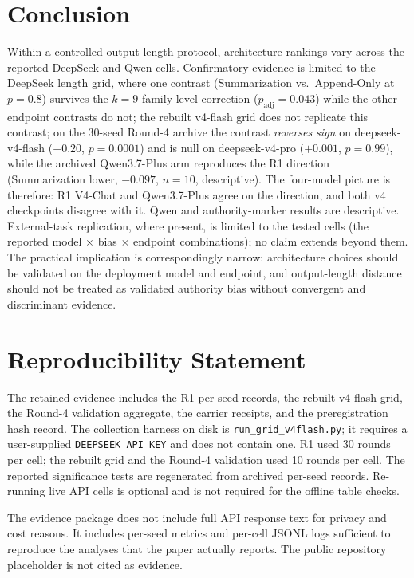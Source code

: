 \documentclass[11pt]{article}
\begin{document}
\section{Conclusion}

Within a controlled output-length protocol, architecture rankings vary across the reported DeepSeek and Qwen cells. Confirmatory evidence is limited to the DeepSeek length grid, where one contrast (Summarization vs.\ Append-Only at $p{=}0.8$) survives the $k{=}9$ family-level correction ($p_{\text{adj}}{=}0.043$) while the other endpoint contrasts do not; the rebuilt v4-flash grid does not replicate this contrast; on the 30-seed Round-4 archive the contrast \emph{reverses sign} on deepseek-v4-flash ($+0.20$, $p{=}0.0001$) and is null on deepseek-v4-pro ($+0.001$, $p{=}0.99$), while the archived Qwen3.7-Plus arm reproduces the R1 direction (Summarization lower, $-0.097$, $n{=}10$, descriptive). The four-model picture is therefore: R1 V4-Chat and Qwen3.7-Plus agree on the direction, and both v4 checkpoints disagree with it. Qwen and authority-marker results are descriptive. External-task replication, where present, is limited to the tested cells (the reported model $\times$ bias $\times$ endpoint combinations); no claim extends beyond them. The practical implication is correspondingly narrow: architecture choices should be validated on the deployment model and endpoint, and output-length distance should not be treated as validated authority bias without convergent and discriminant evidence.


\section*{Reproducibility Statement}
\label{sec:reproducibility}

The retained evidence includes the R1 per-seed records, the rebuilt v4-flash grid, the Round-4 validation aggregate, the carrier receipts, and the preregistration hash record. The collection harness on disk is \texttt{run\_grid\_v4flash.py}; it requires a user-supplied \texttt{DEEPSEEK\_API\_KEY} and does not contain one. R1 used 30 rounds per cell; the rebuilt grid and the Round-4 validation used 10 rounds per cell. The reported significance tests are regenerated from archived per-seed records. Re-running live API cells is optional and is not required for the offline table checks.

The evidence package does not include full API response text for privacy and cost reasons. It includes per-seed metrics and per-cell JSONL logs sufficient to reproduce the analyses that the paper actually reports. The public repository placeholder is not cited as evidence.
\end{document}
